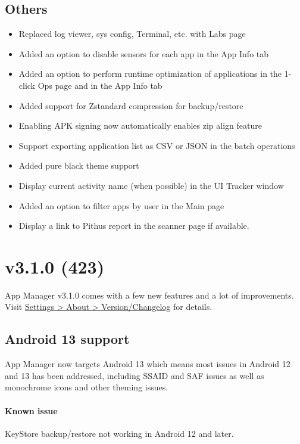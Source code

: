 \subsection{Others}
\begin{itemize}
    \item Replaced log viewer, sys config, Terminal, etc. with Labs page
    \item Added an option to disable sensors for each app in the App Info tab
    \item Added an option to perform runtime optimization of applications in the 1-click Ops page
    and in the App Info tab
    \item Added support for Zstandard compression for backup/restore
    \item Enabling APK signing now automatically enables zip align feature
    \item Support exporting application list as CSV or JSON in the batch operations
    \item Added pure black theme support
    \item Display current activity name (when possible) in the UI Tracker window
    \item Added an option to filter apps by user in the Main page
    \item Display a link to Pithus report in the scanner page if available.
\end{itemize}


\section{v3.1.0 (423)}\label{sec:v3.1.0-(423)}

App Manager v3.1.0 comes with a few new features and a lot of improvements.
Visit \href{app-manager://settings/about/version}{Settings > About > Version/Changelog} for details.

\subsection{Android 13 support}
App Manager now targets Android 13 which means most issues in Android 12 and 13 has been addressed, including SSAID and SAF issues as well as monochrome icons and other theming issues.

\paragraph{Known issue} KeyStore backup/restore not working in Android 12 and later.

